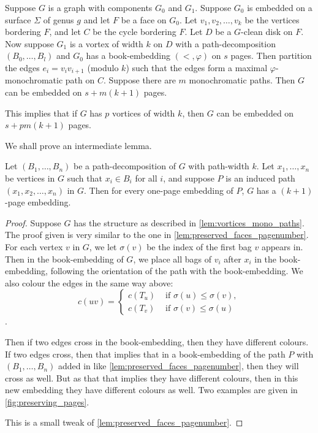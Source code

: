 \begin{lemma}\label{lem:vortices_mono_paths}
	Suppose \(G\) is a graph with components \(G_0\) and \(G_1\). Suppose \(G_0\) is embedded on a surface \(\Sigma \) of genus \(g\) and let \(F\) be a face on \(G_0\). Let \(v_1, v_2, \ldots, v_k\) be the vertices bordering \(F\), and let \(C\) be the cycle bordering \(F\). Let \(D\) be a \(G\)-clean disk on \(F\). Now suppose \(G_1\) is a vortex of width $k$ on \(D\) with a path-decomposition \((B_0, \ldots, B_l)\) and \(G_0\) has a book-embedding \((<, \varphi)\) on $s$ pages. Then partition the edges \(e_i = v_i v_{i + 1}\) (modulo \(k\)) such that the edges form a maximal \(\varphi \)-monochromatic path on \(C\). Suppose there are \(m\) monochromatic paths. Then \(G\) can be embedded on \(s + m(k+1)\) pages.
\end{lemma}

This implies that if $G$ has $p$ vortices of width $k$, then $G$ can be embedded on $s + pm(k + 1)$ pages. 

We shall prove an intermediate lemma.
\begin{lemma}\label{lem:one_page_decomposition}
	Let \((B_1, \ldots, B_n)\) be a path-decomposition of \(G\) with path-width \(k\). Let \(x_1, \ldots, x_n\) be vertices in \(G\) such that \(x_i \in B_i\) for all \(i\), and suppose \(P\) is an induced path \((x_1, x_2, \ldots, x_n)\) in \(G\). Then for every one-page embedding of \(P\), \(G\) has a \((k + 1)\)-page embedding.
\end{lemma}
\begin{proof}
	Suppose \(G\) has the structure as described in \cref{lem:vortices_mono_paths}. 
	The proof given is very similar to the one in \cref{lem:preserved_faces_pagenumber}. For each vertex \(v\) in \(G\), we let \(\sigma(v)\) be the index of the first bag \(v\) appears in. Then in the book-embedding of \(G\), we place all bags of \(v_i\) after \(x_i\) in the book-embedding, following the orientation of the path with the book-embedding. We also colour the edges in the same way above: 
	\begin{equation}
		c(uv) =
		\begin{cases}
			c(T_u) & \text{ if } \sigma(u) \leq \sigma(v), \\
			c(T_v) & \text{ if } \sigma(v) \leq \sigma(u)
		\end{cases}
	\end{equation}.

	Then if two edges cross in the book-embedding, then they have different colours. If two edges cross, then that implies that in a book-embedding of the path \(P\) with \((B_1, \ldots, B_n)\) added in like \cref{lem:preserved_faces_pagenumber}, then they will cross as well. But as that that implies they have different colours, then in this new embedding they have different colours as well. Two examples are given in \cref{fig:preserving_pages}.

	This is a small tweak of \cref{lem:preserved_faces_pagenumber}. 
\end{proof}

